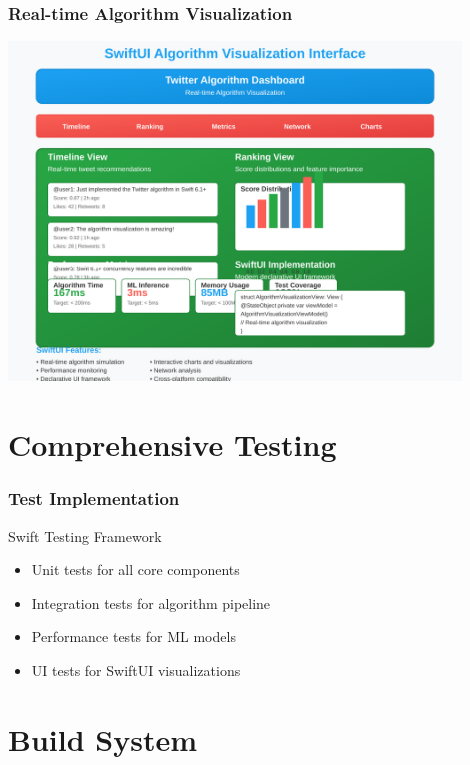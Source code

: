 \documentclass[aspectratio=169]{beamer}
\begin{document}
\begin{frame}
    \frametitle{Real-time Algorithm Visualization}
    \begin{center}
        \includegraphics[width=0.9\textwidth]{images/swiftui-interface.svg}
    \end{center}
\end{frame}

\section{Comprehensive Testing}

\begin{frame}
    \frametitle{Test Implementation}
    \begin{block}{Swift Testing Framework}
        \begin{itemize}
            \item Unit tests for all core components
            \item Integration tests for algorithm pipeline
            \item Performance tests for ML models
            \item UI tests for SwiftUI visualizations
        \end{itemize}
    \end{block}
\end{frame}

\section{Build System}
\end{document}
